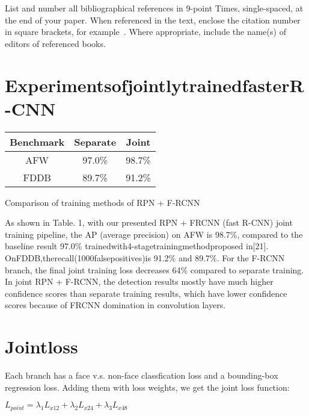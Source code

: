 \documentclass[10pt,twocolumn,letterpaper]{article}
\begin{document}
List and number all bibliographical references in 9-point Times,
single-spaced, at the end of your paper. When referenced in the text,
enclose the citation number in square brackets, for
example~\cite{Authors14}.  Where appropriate, include the name(s) of
editors of referenced books.
\fi


\section{ExperimentsofjointlytrainedfasterR-CNN }

\makeatletter{}\makeatother
\begin{center}
\begin{tabular}{ccc}
\hline
Benchmark & Separate & Joint\\
\hline
AFW & 97.0\% & 98.7\% \\
\hline
FDDB & 89.7\% & 91.2\% \\
\hline
\end{tabular}
\end{center}
\caption{ Comparison of training methods of RPN + F-RCNN }
As shown in Table. 1, with our presented RPN + FRCNN (fast R-CNN) joint training pipeline, the AP (average precision) on AFW is 98.7\%, compared to the baseline result 97.0\% trainedwith4-stagetrainingmethodproposed in[21].
OnFDDB,therecall(1000falsepositives)is 91.2\% and 89.7\%. For the F-RCNN branch, the ﬁnal joint training loss decreases 64\% compared to separate training. In joint RPN + F-RCNN, the detection results mostly have much higher conﬁdence scores than separate training results, which have lower conﬁdence scores because of FRCNN domination in convolution layers.


\section{Jointloss}
 Each branch has a face v.s. non-face classfication loss and a bounding-box regression loss. Adding them with loss weights, we get the joint loss function:

\begin{center}
$L_{point} = \lambda_{1}L_{x12}+ \lambda_{2}L_{x24} + \lambda_{3}L_{x48}$
\end{center}


\end{document}
